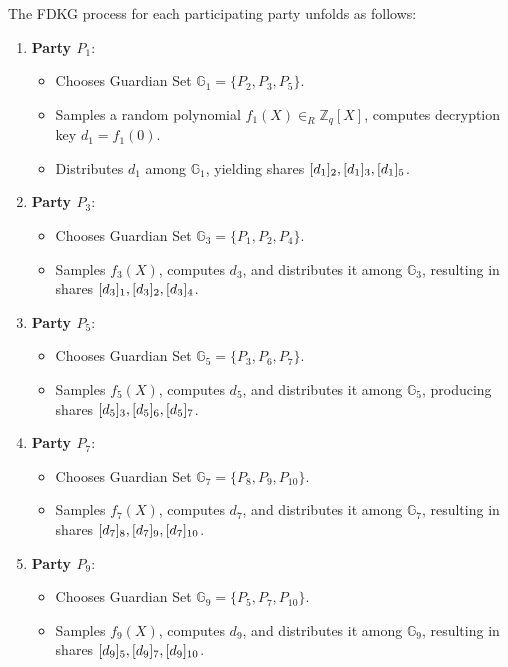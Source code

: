 \documentclass[runningheads]{llncs}
\begin{document}
The FDKG process for each participating party unfolds as follows:

\begin{enumerate}
    \item \textbf{Party $P_1$}:
        \begin{itemize}
            \item Chooses Guardian Set $\mathbb{G}_1 = \{P_2, P_3, P_5\}$.
            \item Samples a random polynomial $f_1(X) \in_R \mathbb{Z}_q[X]$, computes decryption key $d_1 = f_1(0)$.
            \item Distributes $d_1$ among $\mathbb{G}_1$, yielding shares $[d_{1}]_{2}, [d_{1}]_{3}, [d_{1}]_{5}$.
        \end{itemize}

    \item \textbf{Party $P_3$}:
        \begin{itemize}
            \item Chooses Guardian Set $\mathbb{G}_3 = \{P_1, P_2, P_4\}$.
            \item Samples $f_3(X)$, computes $d_3$, and distributes it among $\mathbb{G}_3$, resulting in shares $[d_{3}]_{1}, [d_{3}]_{2}, [d_{3}]_{4}$.
        \end{itemize}

    \item \textbf{Party $P_5$}:
        \begin{itemize}
            \item Chooses Guardian Set $\mathbb{G}_5 = \{P_3, P_6, P_7\}$.
            \item Samples $f_5(X)$, computes $d_5$, and distributes it among $\mathbb{G}_5$, producing shares $[d_{5}]_{3}, [d_{5}]_{6}, [d_{5}]_{7}$.
        \end{itemize}

    \item \textbf{Party $P_7$}:
        \begin{itemize}
            \item Chooses Guardian Set $\mathbb{G}_7 = \{P_8, P_9, P_{10}\}$.
            \item Samples $f_7(X)$, computes $d_7$, and distributes it among $\mathbb{G}_7$, resulting in shares $[d_{7}]_{8}, [d_{7}]_{9}, [d_{7}]_{10}$.
        \end{itemize}

    \item \textbf{Party $P_9$}:
        \begin{itemize}
            \item Chooses Guardian Set $\mathbb{G}_9 = \{P_5, P_7, P_{10}\}$.
            \item Samples $f_9(X)$, computes $d_9$, and distributes it among $\mathbb{G}_9$, resulting in shares $[d_{9}]_{5}, [d_{9}]_{7}, [d_{9}]_{10}$.
        \end{itemize}
\end{enumerate}
\end{document}
